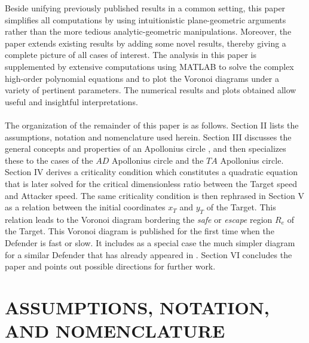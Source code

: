 \documentclass[final,5p,times,twocolumn]{elsarticle}
\begin{document}
Beside unifying previously published results in a common setting, this paper simplifies all computations by using intuitionistic plane-geometric arguments rather than the more tedious analytic-geometric manipulations. 
Moreover, the paper extends existing results by adding some novel results, thereby giving a complete picture of all cases of interest.
The analysis in this paper is supplemented by extensive computations using MATLAB to solve the complex high-order polynomial equations and to plot the Voronoi diagrams under a variety of pertinent parameters. The numerical results and plots obtained allow useful and insightful interpretations.
\\
\\
The organization of the remainder of this paper is as follows. Section II lists the assumptions, notation and nomenclature used herein. Section III discusses the general concepts and properties of an Apollonius circle \cite{ayoub2003proving,ayoub2006circle,partensky2008circle,fulton2015conflict}, and then specializes these to the cases of the $AD$ Apollonius circle and the $TA$ Apollonius circle. Section IV derives a criticality condition which constitutes a quadratic equation that is later solved for the critical dimensionless ratio between the Target speed and Attacker speed. The same criticality condition is then rephrased in Section V as a relation between the initial coordinates $x_T$ and $y_T$ of the Target. This relation leads to the Voronoi diagram bordering the \textit{safe} or \textit{escape} region $R_e$ of the Target. This Voronoi diagram is published for the first time when the Defender is fast or slow. It includes as a special case the much simpler diagram for a similar Defender that has already appeared in \cite{garcia2015escape}. Section VI concludes the paper and points out possible directions for further work.  


\section{ASSUMPTIONS, NOTATION, AND NOMENCLATURE}
\end{document}
